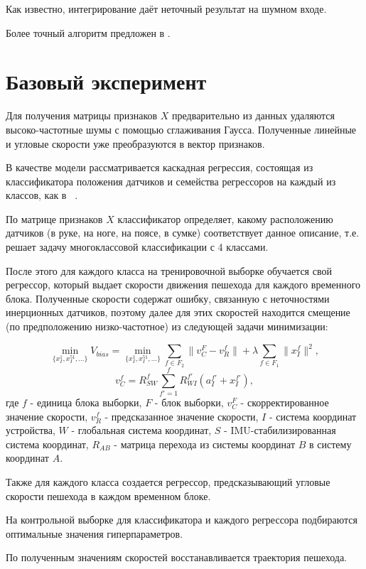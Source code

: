 \documentclass[12pt,twoside]{article}
\begin{document}
Как известно, интегрирование даёт неточный результат на шумном входе.

Более точный алгоритм предложен в \cite{journals/corr/abs-1712-09004}.

\section{Базовый эксперимент}

Для получения матрицы признаков $X$ предварительно из данных удаляются высоко-частотные шумы с помощью сглаживания Гаусса. Полученные линейные и угловые скорости уже преобразуются в вектор признаков.

В качестве модели рассматривается каскадная регрессия, состоящая из классификатора положения датчиков и семейства регрессоров на каждый из классов, как в ~\cite{journals/corr/abs-1712-09004}. 

По матрице признаков $X$ классификатор определяет, какому расположению датчиков (в руке, на ноге, на поясе, в сумке) соответствует данное описание, т.е. решает задачу многоклассовой классификации с 4 классами.

После этого для каждого класса на тренировочной выборке обучается свой регрессор, который выдает скорости движения пешехода для каждого временного блока. Полученные скорости содержат ошибку, связанную с неточностями инерционных датчиков, поэтому далее для этих скоростей находится смещение (по предположению низко-частотное) из следующей задачи минимизации:

\[\min_{\{x^1_I, x^51_I,\dots\}}V_{bias}=
\min_{\{x^1_I, x^51_I,\dots\}}\sum_{f \in F_2}\|v_C^F-v_R^f\|+
\lambda\sum_{f \in F_1}\|x^f_I\|^2,\]
\[v_C^f = R_{SW}^f\sum_{f'=1}^f R_{WI}^{f'}(a_I^{f'}+x_I^{f'}),\]
где $f$ - единица блока выборки, $F$ - блок выборки, $v_C^F$ - скорректированное значение скорости, $v_R^f$ - предсказанное значение скорости, $I$ - система координат устройства, $W$ - глобальная система координат, $S$ - IMU-стабилизированная система координат, $R_{AB}$ - матрица перехода из системы координат $B$ в систему координат $A$.

Также для каждого класса создается регрессор, предсказывающий угловые скорости пешехода в каждом временном блоке. 

На контрольной выборке для классификатора и каждого регрессора подбираются оптимальные значения гиперпараметров.

По полученным значениям скоростей восстанавливается траектория пешехода.
\end{document}
